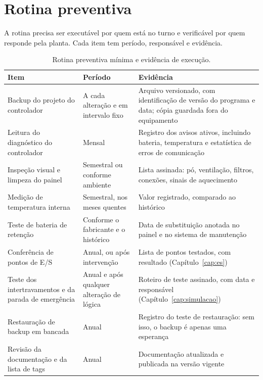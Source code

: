 \section{Rotina preventiva}

A rotina precisa ser executável por quem está no turno e verificável por quem responde pela planta.
Cada item tem período, responsável e evidência.

\begin{table}[H]
  \centering
  \caption{Rotina preventiva mínima e evidência de execução.}
  \label{tab:rotina-preventiva}
  \begin{tabular}{p{4.4cm} p{3.0cm} p{6.9cm}}
    \toprule
    Item & Período & Evidência \\
    \midrule
    Backup do projeto do controlador & A cada alteração e em intervalo fixo
      & Arquivo versionado, com identificação de versão do programa e data; cópia guardada fora do
        equipamento \\
    Leitura do diagnóstico do controlador & Mensal
      & Registro dos avisos ativos, incluindo bateria, temperatura e estatística de erros de
        comunicação \\
    Inspeção visual e limpeza do painel & Semestral ou conforme ambiente
      & Lista assinada: pó, ventilação, filtros, conexões, sinais de aquecimento \\
    Medição de temperatura interna & Semestral, nos meses quentes
      & Valor registrado, comparado ao histórico \\
    Teste de bateria de retenção & Conforme o fabricante e o histórico
      & Data de substituição anotada no painel e no sistema de manutenção \\
    Conferência de pontos de E/S & Anual, ou após intervenção
      & Lista de pontos testados, com resultado (Capítulo~\ref{cap:es}) \\
    Teste dos intertravamentos e da parada de emergência & Anual e após qualquer alteração de lógica
      & Roteiro de teste assinado, com data e responsável (Capítulo~\ref{cap:simulacao}) \\
    Restauração de backup em bancada & Anual
      & Registro do teste de restauração: sem isso, o backup é apenas uma esperança \\
    Revisão da documentação e da lista de tags & Anual
      & Documentação atualizada e publicada na versão vigente \\
    \bottomrule
  \end{tabular}
\end{table}

